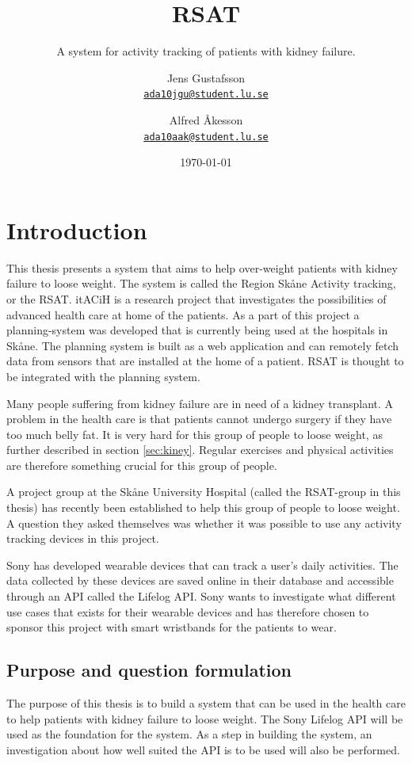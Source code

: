 \documentclass{cslthse-msc}
\author{
	Jens Gustafsson \\
	{\normalsize \href{mailto:ada10jgu@student.lu.se}{\texttt{ada10jgu@student.lu.se}}}
	\and
	Alfred Åkesson \\
    {\normalsize \href{mailto:ada10aak@student.lu.se}{\texttt{ada10aak@student.lu.se}}}
}
\title{RSAT}
\subtitle{A system for activity tracking of patients with kidney failure.}
\date{\today}
\begin{document}
\makefrontmatter


\chapter[Introduction]{Introduction}

This thesis presents a system that aims to help over-weight patients with kidney failure to loose weight. The system is called the Region Skåne Activity tracking, or the RSAT. itACiH is a research project that investigates the possibilities of advanced health care at home of the patients. As a part of this project a planning-system was developed that is currently being used at the hospitals in Skåne. The planning system is built as a web application and can remotely fetch data from sensors that are installed at the home of a patient. RSAT is thought to be integrated with the planning system. 

Many people suffering from kidney failure are in need of a kidney transplant. A problem in the health care is that patients cannot undergo surgery if they have too much belly fat. It is very hard for this group of people to loose weight, as further described in section \ref{sec:kiney}. Regular exercises and physical activities are therefore something crucial for this group of people. 

A project group at the Skåne University Hospital (called the RSAT-group in this thesis) has recently been established to help this group of people to loose weight. A question they asked themselves was whether it was possible to use any activity tracking devices in this project. 

Sony has developed wearable devices that can track a user’s daily activities. The data collected by these devices are saved online in their database and accessible through an API called the Lifelog API. Sony wants to investigate what different use cases that exists for their wearable devices and has therefore chosen to sponsor this project with smart wristbands for the patients to wear.





\newpage

\section{Purpose and question formulation}

The purpose of this thesis is to build a system that can be used in the health care to help patients with kidney failure to loose weight. The Sony Lifelog API will be used as the foundation for the system. As a step in building the system, an investigation about how well suited the API is to be used will also be performed. 
\end{document}
